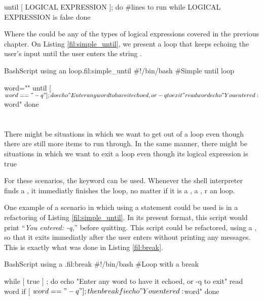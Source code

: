 \begin{command_line}[Bash]
until [ LOGICAL EXPRESSION ]; do
    #lines to run while LOGICAL EXPRESSION is false
done    
\end{command_line}
Where the  could be any of the types of logical expressions covered in the previous chapter. On Listing \ref{fil:simple_until}, we present a loop that keeps echoing the user's input until the user enters the string .

\begin{source_code_float}{Bash}{Script using an  loop.}{fil:simple_until}
#!/bin/bash
#Simple until loop

word=""
until [ $word == "-q" ] ; do
   echo "Enter any word to have it echoed, or -q to exit"
   read word
   echo "You entered: $word"
done
\end{source_code_float}

\section{}
There might be situations in which we want to get out of a  loop even though there are still more items to run through. In the same manner, there might be situations in which we want to exit a  loop even though its logical expression is true

For these scenarios, the keyword  can be used. Whenever the shell interpreter finds a , it immediatly finishes the loop, no matter if it is a , a , r an  loop. 

One example of a scenario in which using a  statement could be used is in a refactoring of Listing \ref{fil:simple_until}. In its present format, this script would print ``\textit{You entered: -q},'' before quitting. This script could be refactored, using a , so that it exits immediatly after the user enters  without printing any messages. This is exactly what was done in Listing \ref{fil:break}.

\begin{source_code_float}{Bash}{Script using a .}{fil:break}
#!/bin/bash
#Loop with a break

while [ true ] ; do
   echo "Enter any word to have it echoed, or -q to exit"
   read word
   if [ $word == "-q" ] ; then
       break
   fi
   echo "You entered: $word"   
done
\end{source_code_float}

